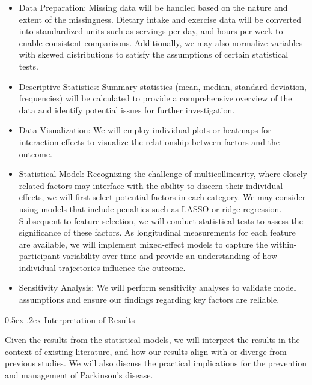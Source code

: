 \documentclass[12pt,]{article}
\makeatletter
\renewcommand\subsubsection{
  \@startsection{subsubsection}{3}{\z@}
    {-1.0ex\@plus -1ex \@minus -.2ex}%
    {0.5ex \@plus .2ex}%
    {\normalfont\normalsize\bf}} %
\makeatother
\begin{document}
\begin{itemize}
\item
  Data Preparation: Missing data will be handled based on the nature and
  extent of the missingness. Dietary intake and exercise data will be
  converted into standardized units such as servings per day, and hours
  per week to enable consistent comparisons. Additionally, we may also
  normalize variables with skewed distributions to satisfy the
  assumptions of certain statistical tests.
\item
  Descriptive Statistics: Summary statistics (mean, median, standard
  deviation, frequencies) will be calculated to provide a comprehensive
  overview of the data and identify potential issues for further
  investigation.
\item
  Data Visualization: We will employ individual plots or heatmaps for
  interaction effects to visualize the relationship between factors and
  the outcome.
\item
  Statistical Model: Recognizing the challenge of multicollinearity,
  where closely related factors may interface with the ability to
  discern their individual effects, we will first select potential
  factors in each category. We may consider using models that include
  penalties such as LASSO or ridge regression. Subsequent to feature
  selection, we will conduct statistical tests to assess the
  significance of these factors. As longitudinal measurements for each
  feature are available, we will implement mixed-effect models to
  capture the within-participant variability over time and provide an
  understanding of how individual trajectories influence the outcome.
\item
  Sensitivity Analysis: We will perform sensitivity analyses to validate
  model assumptions and ensure our findings regarding key factors are
  reliable.
\end{itemize}

\hypertarget{interpretation-of-results}{%
\subsubsection{Interpretation of
Results}\label{interpretation-of-results}}

Given the results from the statistical models, we will interpret the
results in the context of existing literature, and how our results align
with or diverge from previous studies. We will also discuss the
practical implications for the prevention and management of Parkinson's
disease.
\end{document}
